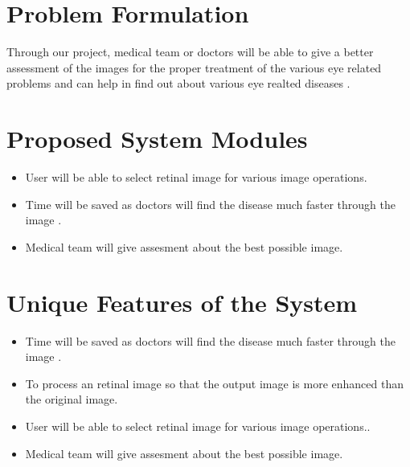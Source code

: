\section{Problem Formulation}
Through our project, medical team or doctors will be able to give a better assessment of the images for the proper treatment of the various eye related problems and can help in find out about various eye realted diseases  .   

\section{Proposed System Modules}

\begin{itemize}
	\item User will be able to select retinal image for various image operations.

	\item Time will be saved as doctors will find the disease much faster through the image  .
	
	\item Medical team will give assesment about the best possible image.   
	
	
	


\end{itemize}

 
\section{Unique Features of the System}
\begin{itemize}

\item Time will be saved as doctors will find the disease much faster through the image  .
\item To process an retinal image so that the output image is more enhanced than the original image.

\item User will be able to select retinal image for various image operations..

\item Medical team will give assesment about the best possible image.

\end{itemize}


